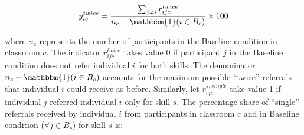 \documentclass[11pt,a4paper,oneside]{article}
\begin{document}
\begin{equation}
  y_{ic}^{twice} = \frac{\sum_{j \neq i} r_{ijc}^{twice}}{n_c - \mathbbm{1}(i \in B_c)} \times 100
  \end{equation}

where $n_c$ represents the number of participants in the Baseline condition in classroom $c$. The indicator $r_{ijc}^{twice}$ takes value 0 if participant $j$ in the Baseline condition does not refer individual $i$ for both skills. The denominator $n_c - \mathbbm{1}(i \in B_c)$ accounts for the maximum possible ``twice'' referrals that individual $i$ could receive as before. Similarly, let $r_{ijc}^{s,single}$ take value 1 if individual $j$ referred individual $i$ only for skill $s$. The percentage share of ``single'' referrals received by individual $i$ from participants in classroom $c$ and in Baseline condition ($\forall j \in B_c$) for skill $s$ is: 
\end{document}
